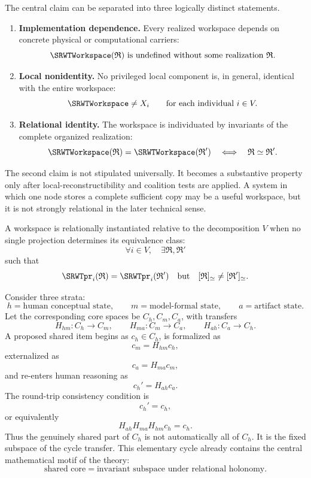 
The central claim can be separated into three logically distinct statements.

\begin{enumerate}
\item \textbf{Implementation dependence.}
Every realized workspace depends on concrete physical or computational
carriers:
\[
\SRWTWorkspace(\mathfrak R)
\text{ is undefined without some realization }\mathfrak R.
\]

\item \textbf{Local nonidentity.}
No privileged local component is, in general, identical with the entire
workspace:
\[
\SRWTWorkspace\neq X_i
\qquad\text{for each individual }i\in V.
\]

\item \textbf{Relational identity.}
The workspace is individuated by invariants of the complete organized
realization:
\[
\SRWTWorkspace(\mathfrak R)=\SRWTWorkspace(\mathfrak R')
\quad\Longleftrightarrow\quad
\mathfrak R\simeq\mathfrak R'.
\]
\end{enumerate}

The second claim is not stipulated universally. It becomes a substantive
property only after local-reconstructibility and coalition tests are applied.
A system in which one node stores a complete sufficient copy may be a useful
workspace, but it is not strongly relational in the later technical sense.

\begin{SRWTdefinition}\label{SRWT:def:relational-instantiation}
A workspace is relationally instantiated relative to the decomposition
\(V\) when no single projection determines its equivalence class:
\[
\forall i\in V,\quad
\exists\mathfrak R,\mathfrak R'
\]
such that
\[
\SRWTpr_i(\mathfrak R)=\SRWTpr_i(\mathfrak R')
\quad\text{but}\quad
[\mathfrak R]_{\simeq}\neq[\mathfrak R']_{\simeq}.
\]
\end{SRWTdefinition}


Consider three strata:
\[
h=\text{human conceptual state},\qquad
m=\text{model-formal state},\qquad
a=\text{artifact state}.
\]
Let the corresponding core spaces be \(C_h,C_m,C_a\), with transfers
\[
H_{hm}:C_h\to C_m,
\qquad
H_{ma}:C_m\to C_a,
\qquad
H_{ah}:C_a\to C_h.
\]
A proposed shared item begins as \(c_h\in C_h\), is formalized as
\[
c_m=H_{hm}c_h,
\]
externalized as
\[
c_a=H_{ma}c_m,
\]
and re-enters human reasoning as
\[
c_h'=H_{ah}c_a.
\]
The round-trip consistency condition is
\[
c_h'=c_h,
\]
or equivalently
\[
\boxed{
H_{ah}H_{ma}H_{hm}c_h=c_h.
}
\]
Thus the genuinely shared part of \(C_h\) is not automatically all of
\(C_h\). It is the fixed subspace of the cycle transfer. This elementary
cycle already contains the central mathematical motif of the theory:
\[
\text{shared core}=\text{invariant subspace under relational holonomy}.
\]

